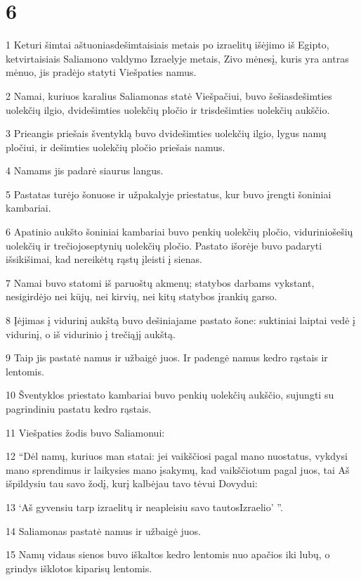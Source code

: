 \chapter{6}


\par 1 Keturi šimtai aštuoniasdešimtaisiais metais po izraelitų išėjimo iš Egipto, ketvirtaisiais Saliamono valdymo Izraelyje metais, Zivo mėnesį, kuris yra antras mėnuo, jis pradėjo statyti Viešpaties namus. 
\par 2 Namai, kuriuos karalius Saliamonas statė Viešpačiui, buvo šešiasdešimties uolekčių ilgio, dvidešimties uolekčių pločio ir trisdešimties uolekčių aukščio. 
\par 3 Prieangis priešais šventyklą buvo dvidešimties uolekčių ilgio, lygus namų pločiui, ir dešimties uolekčių pločio priešais namus. 
\par 4 Namams jis padarė siaurus langus. 
\par 5 Pastatas turėjo šonuose ir užpakalyje priestatus, kur buvo įrengti šoniniai kambariai. 
\par 6 Apatinio aukšto šoniniai kambariai buvo penkių uolekčių pločio, vidurinio­šešių uolekčių ir trečiojo­septynių uolekčių pločio. Pastato išorėje buvo padaryti išsikišimai, kad nereikėtų rąstų įleisti į sienas. 
\par 7 Namai buvo statomi iš paruoštų akmenų; statybos darbams vykstant, nesigirdėjo nei kūjų, nei kirvių, nei kitų statybos įrankių garso. 
\par 8 Įėjimas į vidurinį aukštą buvo dešiniajame pastato šone: suktiniai laiptai vedė į vidurinį, o iš vidurinio į trečiąjį aukštą. 
\par 9 Taip jis pastatė namus ir užbaigė juos. Ir padengė namus kedro rąstais ir lentomis. 
\par 10 Šventyklos priestato kambariai buvo penkių uolekčių aukščio, sujungti su pagrindiniu pastatu kedro rąstais. 
\par 11 Viešpaties žodis buvo Saliamonui: 
\par 12 “Dėl namų, kuriuos man statai: jei vaikščiosi pagal mano nuostatus, vykdysi mano sprendimus ir laikysies mano įsakymų, kad vaikščiotum pagal juos, tai Aš išpildysiu tau savo žodį, kurį kalbėjau tavo tėvui Dovydui: 
\par 13 ‘Aš gyvensiu tarp izraelitų ir neapleisiu savo tautos­Izraelio’ ”. 
\par 14 Saliamonas pastatė namus ir užbaigė juos. 
\par 15 Namų vidaus sienos buvo iškaltos kedro lentomis nuo apačios iki lubų, o grindys išklotos kiparisų lentomis. 
